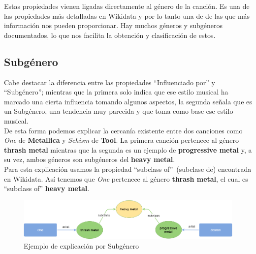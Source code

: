 Estas propiedades vienen ligadas directamente al género de la canción. Es una de las propiedades más detalladas en Wikidata y por lo tanto una de de las que más información nos pueden proporcionar. Hay muchos géneros y subgéneros documentados, lo que nos facilita la obtención y clasificación de estos.\\

\subsection{Subgénero}

Cabe destacar la diferencia entre las propiedades ``Influenciado por'' y ``Subgénero''; mientras que la primera solo indica que ese estilo musical ha marcado una cierta influencia tomando algunos aspectos, la segunda señala que es un Subgénero, una tendencia muy parecida y que toma como base ese estilo musical.\\

De esta forma podemos explicar la cercanía existente entre dos canciones como \textit{One} de \textbf{Metallica} y \textit{Schism} de \textbf{Tool}. La primera canción pertenece al género \textbf{thrash metal} mientras que la segunda es un ejemplo de \textbf{progressive metal} y, a su vez, ambos géneros son subgéneros del \textbf{heavy metal}.\\

Para esta explicación usamos la propiedad ``subclass of''~(subclase de) encontrada en Wikidata. Así tenemos que \textit{One} pertenece al género \textbf{thrash metal}, el cual es ``subclass of'' \textbf{heavy metal}.\\

\begin{figure}[h!]
	\centering
	\includegraphics[width = 1\textwidth]{Imagenes/Bitmap/Subgenre.png}
	\caption{Ejemplo de explicación por Subgénero}
	\label{fig:sampleImage}
\end{figure}


